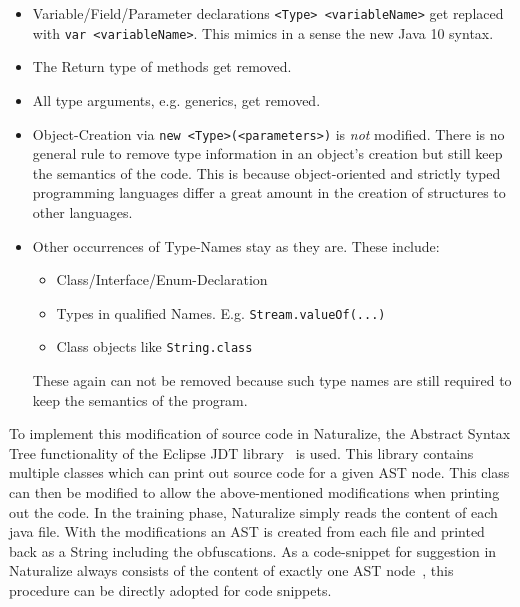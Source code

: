 \begin{itemize}
    \item Variable/Field/Parameter declarations \texttt{<Type> <variableName>} get replaced with \texttt{var <variableName>}. This mimics in a sense the new Java 10 syntax.
    \item The Return type of methods get removed.
    \item All type arguments, e.g. generics, get removed.
    \item Object-Creation via \texttt{new <Type>(<parameters>)} is \emph{not} modified. There is no general rule to remove type information in an object's creation but still keep the semantics of the code. This is because object-oriented and strictly typed programming languages differ a great amount in the creation of structures to other languages.
    \item Other occurrences of Type-Names stay as they are. These include:
    \begin{itemize}
        \item Class/Interface/Enum-Declaration
        \item Types in qualified Names. E.g. \texttt{Stream.valueOf(...)}
        \item Class objects like \texttt{String.class}
    \end{itemize}
    These again can not be removed because such type names are still required to keep the semantics of the program.
\end{itemize}

To implement this modification of source code in Naturalize, the Abstract Syntax Tree functionality of the Eclipse JDT library~\cite{todo} is used. This library contains multiple classes which can print out source code for a given AST node. This class can then be modified to allow the above-mentioned modifications when printing out the code. In the training phase, Naturalize simply reads the content of each java file. With the modifications an AST is created from each file and printed back as a String including the obfuscations. As a code-snippet for suggestion in Naturalize always consists of the content of exactly one AST node~\cite{naturalize}, this procedure can be directly adopted for code snippets.


